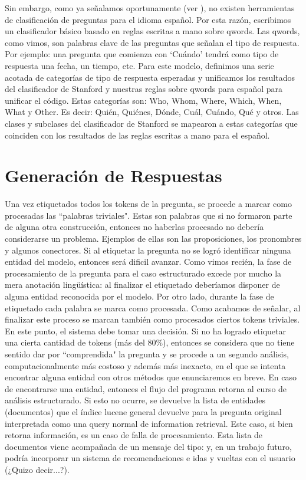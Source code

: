 Sin embargo, como ya señalamos oportunamente (ver ), no existen herramientas de clasificación de preguntas para el idioma español. Por esta razón, escribimos un clasificador básico basado en reglas escritas a mano sobre qwords. Las qwords, como vimos, son palabras clave de las preguntas que señalan el tipo de respuesta. Por ejemplo: una pregunta que comienza con `Cuándo' tendrá como tipo de respuesta una fecha, un tiempo, etc. Para este modelo, definimos una serie acotada de categorías de tipo de respuesta esperadas y unificamos los resultados del clasificador de Stanford y nuestras reglas sobre qwords para español para unificar el código. Estas categorías son:  Who, Whom, Where, Which,  When,  What y Other. Es decir: Quién, Quiénes, Dónde, Cuál, Cuándo, Qué y otros. Las clases y subclases del clasificador de Stanford se mapearon a estas categorías que coinciden con los resultados de las reglas escritas a mano para el español. 


\section{Generación de Respuestas}
\label{sec:ar-mitic}

Una vez etiquetados todos los tokens de la pregunta, se procede a marcar como procesadas las ``palabras triviales". Estas son palabras que si no formaron parte de alguna otra construcción, entonces no haberlas procesado no debería considerarse un problema. Ejemplos de ellas son las proposiciones, los pronombres y algunos conectores. Si al etiquetar la pregunta no se logró identificar ninguna entidad del modelo, entonces será dificil avanzar. Como vimos recién, la fase de procesamiento de la pregunta para el caso estructurado excede por mucho la mera anotación lingüística: al finalizar el etiquetado deberíamos disponer de alguna entidad reconocida por el modelo. Por otro lado, durante la fase de etiquetado cada palabra se marca como procesada. Como acabamos de señalar, al finalizar este proceso se marcan también como procesados ciertos tokens triviales. En este punto, el sistema debe tomar una decisión. Si no ha logrado etiquetar una cierta cantidad de tokens (más del 80\%), entonces se considera que no tiene sentido dar por ``comprendida" la pregunta y se procede a un segundo análisis, computacionalmente más costoso y además más inexacto, en el que se intenta encontrar alguna entidad con otros métodos que enunciaremos en breve. En caso de encontrarse una entidad, entonces el flujo del programa retorna al curso de análisis estructurado. Si esto no ocurre, se devuelve la lista de entidades (documentos) que el índice lucene general devuelve para la pregunta original interpretada como una query normal de information retrieval. Este caso, si bien retorna información, es un caso de falla de procesamiento. Esta lista de documentos viene acompañada de un mensaje del tipo:  y, en un trabajo futuro, podría incorporar un sistema de recomendaciones e idas y vueltas con el usuario (¿Quizo decir...?).

